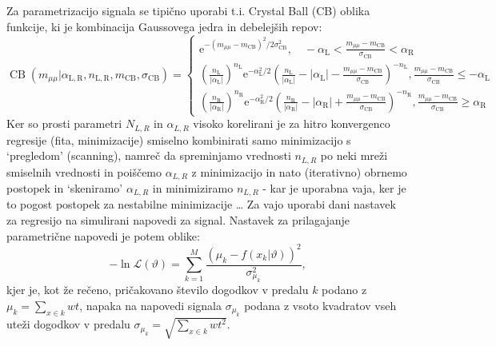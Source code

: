 \documentclass[slovene,11pt,a4paper]{article}
\begin{document}
Za parametrizacijo signala se tipično uporabi t.i. Crystal Ball (CB) oblika funkcije, ki je kombinacija Gaussovega jedra in debelejših repov:
\begin{equation*}
\operatorname{CB}\left(m_{\mu \mu}|\alpha_{\mathrm{L},\mathrm{R}},n_{\mathrm{L},\mathrm{R}}, m_{\mathrm{CB}},\sigma_{\mathrm{CB}} \right)=\left\{\begin{array}{l}
\mathrm{e}^{-\left(m_{\mu \mu}-m_{\mathrm{CB}}\right)^{2} / 2 \sigma_{\mathrm{CB}}^{2}}, \quad-\alpha_{\mathrm{L}}<\frac{m_{\mu \mu}-m_{\mathrm{CB}}}{\sigma_{\mathrm{CB}}}<\alpha_{\mathrm{R}} \\
\left(\frac{n_{\mathrm{L}}}{\left|\alpha_{\mathrm{L}}\right|}\right)^{n_{\mathrm{L}}} \mathrm{e}^{-\alpha_{\mathrm{L}}^{2} / 2}\left(\frac{n_{\mathrm{L}}}{\left|\alpha_{\mathrm{L}}\right|}-\left|\alpha_{\mathrm{L}}\right|-\frac{m_{\mu \mu}-m_{\mathrm{CB}}}{\sigma_{\mathrm{CB}}}\right)^{-n_{\mathrm{L}}}, \frac{m_{\mu \mu}-m_{\mathrm{CB}}}{\sigma_{\mathrm{CB}}} \leq-\alpha_{\mathrm{L}} \\
\left(\frac{n_{\mathrm{R}}}{\left|\alpha_{\mathrm{R}}\right|}\right)^{n_{\mathrm{R}}} \mathrm{e}^{-\alpha_{\mathrm{R}}^{2} / 2}\left(\frac{n_{\mathrm{R}}}{\left|\alpha_{\mathrm{R}}\right|}-\left|\alpha_{\mathrm{R}}\right|+\frac{m_{\mu \mu}-m_{\mathrm{CB}}}{\sigma_{\mathrm{CB}}}\right)^{-n_{\mathrm{R}}}, \frac{m_{\mu \mu}-m_{\mathrm{CB}}}{\sigma_{\mathrm{CB}}} \geq \alpha_{\mathrm{R}}
\end{array}\right.
\end{equation*}
Ker so prosti parametri $N_{L,R}$ in $\alpha_{L,R}$ visoko korelirani je za hitro konvergenco regresije (fita, minimizacije) smiselno kombinirati samo minimizacijo s `pregledom' (scanning), namreč da spreminjamo vrednosti $n_{L,R}$ po neki mreži smiselnih vrednosti in poiščemo $\alpha_{L,R}$ z minimizacijo in nato (iterativno) obrnemo postopek in `skeniramo' $\alpha_{L,R}$ in minimiziramo $n_{L,R}$ - kar je uporabna vaja, ker je to pogost postopek za nestabilne minimizacije \ldots
Za vajo uporabi dani nastavek za regresijo na simulirani napovedi za signal. Nastavek za prilagajanje parametrične napovedi je potem oblike:
\begin{equation*}
-\ln\mathcal{L}(\vartheta) = \sum_{k=1}^M \frac{(\mu_k-f(x_k|\vartheta))^2}{\sigma_{\mu_k}^2},
\end{equation*}
kjer je, kot že rečeno, pričakovano število dogodkov v predalu $k$ podano z $\mu_k=\sum_{x \in k} wt$, napaka na napovedi signala $\sigma_{\mu_k}$ podana z vsoto kvadratov vseh uteži dogodkov v predalu $\sigma_{\mu_k}=\sqrt{\sum_{x \in k} wt^2}$.
\end{document}
